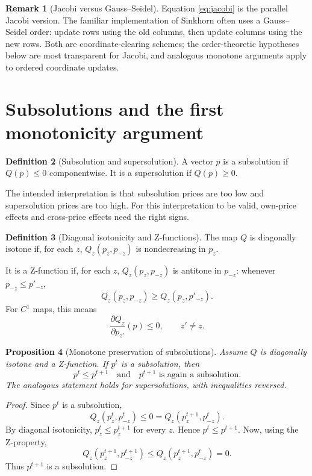 \documentclass[11pt]{article}
\theoremstyle{definition}
\newtheorem{definition}{Definition}[section]
\newtheorem{remark}[definition]{Remark}
\theoremstyle{plain}
\newtheorem{proposition}[definition]{Proposition}
\begin{document}
\begin{remark}[Jacobi versus Gauss--Seidel]
Equation \eqref{eq:jacobi} is the parallel Jacobi version. The familiar implementation of Sinkhorn often uses a Gauss--Seidel order: update rows using the old columns, then update columns using the new rows. Both are coordinate-clearing schemes; the order-theoretic hypotheses below are most transparent for Jacobi, and analogous monotone arguments apply to ordered coordinate updates.
\end{remark}

\section{Subsolutions and the first monotonicity argument}

\begin{definition}[Subsolution and supersolution]
A vector $p$ is a subsolution if $Q(p)\leq 0$ componentwise. It is a supersolution if $Q(p)\geq 0$.
\end{definition}

The intended interpretation is that subsolution prices are too low and supersolution prices are too high. For this interpretation to be valid, own-price effects and cross-price effects need the right signs.

\begin{definition}[Diagonal isotonicity and Z-functions]
The map $Q$ is diagonally isotone if, for each $z$, $Q_z(p_z,p_{-z})$ is nondecreasing in $p_z$.

It is a Z-function if, for each $z$, $Q_z(p_z,p_{-z})$ is antitone in $p_{-z}$: whenever $p_{-z}\leq p'_{-z}$,
\[
        Q_z(p_z,p_{-z})\geq Q_z(p_z,p'_{-z}).
\]
For $C^1$ maps, this means
\[
        \frac{\partial Q_z}{\partial p_{z'}}(p)\leq 0,\qquad z'\neq z.
\]
\end{definition}

\begin{proposition}[Monotone preservation of subsolutions]\label{prop:sub}
Assume $Q$ is diagonally isotone and a Z-function. If $p^t$ is a subsolution, then
\[
        p^t\leq p^{t+1}\quad\text{and}\quad p^{t+1}\text{ is again a subsolution}.
\]
The analogous statement holds for supersolutions, with inequalities reversed.
\end{proposition}

\begin{proof}
Since $p^t$ is a subsolution,
\[
        Q_z(p_z^t,p^t_{-z})\leq 0=Q_z(p_z^{t+1},p^t_{-z}).
\]
By diagonal isotonicity, $p_z^t\leq p_z^{t+1}$ for every $z$. Hence $p^t\leq p^{t+1}$. Now, using the Z-property,
\[
        Q_z(p_z^{t+1},p_{-z}^{t+1})\leq Q_z(p_z^{t+1},p_{-z}^{t})=0.
\]
Thus $p^{t+1}$ is a subsolution.
\end{proof}
\end{document}
